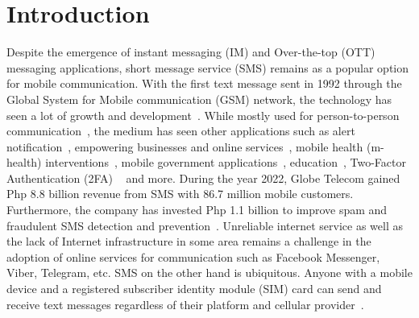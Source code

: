 \documentclass{report}
\begin{document}
\section{Introduction}
Despite the emergence of instant messaging (IM) and Over-the-top (OTT)
messaging applications, short message service (SMS) remains as a popular option
for mobile communication. With the first text message sent in 1992 through the
Global System for Mobile communication (GSM) network, the technology has seen
a lot of growth and  development~\cite{LeBodic_2005}. While mostly used for
person-to-person communication~\cite{Herring_Stein_Virtanen_2013}, the medium
has seen other applications such as alert notification~\cite{Yoo_Lee_Yoo_Xiao_2021,
	Azid_Sharma_Raghuwaiya_Chand_Prasad_Jacquier_2015},
empowering businesses and online services~\cite{Gargaro_2023, Okazaki_Taylor_2008,
	SecureSMS14}, mobile health (m-health) interventions~\cite{NudgeFlu23, SMSUx22},
mobile government applications~\cite{Onashoga_Ogunjobi_Ibharalu_Lawal_2016, EGov13},
education~\cite{Hill_Hill_Sherman_2007}, Two-Factor Authentication (2FA)
~\cite{DynamicOTP} and more. During the year 2022, Globe Telecom gained
Php 8.8 billion revenue from SMS with 86.7 million mobile customers.
Furthermore, the company has invested Php 1.1 billion to improve spam and
fraudulent SMS detection and prevention~\cite{GlobeIR22}. Unreliable internet
service as well as the lack of Internet infrastructure in some area remains a
challenge in the adoption of online services for communication such as
Facebook Messenger, Viber, Telegram, etc. SMS on the other hand is ubiquitous.
Anyone with a mobile device and a registered subscriber identity module (SIM)
card can send and receive text messages regardless of their platform and
cellular provider~\cite{PhilStar}.
\end{document}
